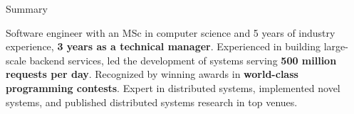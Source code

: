 \documentclass[
	10pt, %
]{resume} %
\begin{document}

\begin{rSection}{Summary}

  Software engineer with an MSc in computer science and 5 years of industry
  experience, \textbf{3 years as a technical manager}. Experienced in
  building large-scale backend services, led the development of systems serving
  \textbf{500 million requests per day}. Recognized by winning awards in
  \textbf{world-class programming contests}. Expert in distributed systems,
  implemented novel systems, and published distributed systems research in top
  venues.

\end{rSection}

\end{document}
